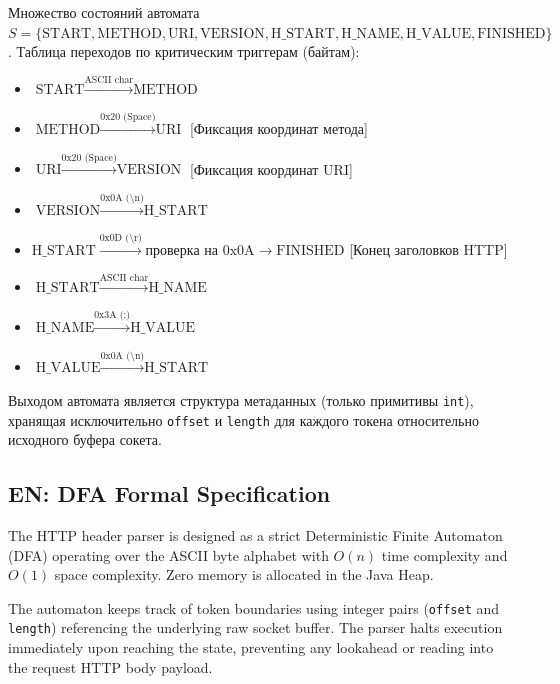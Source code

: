 \documentclass[12pt,a4paper]{article}
\begin{document}
Множество состояний автомата $S = \{ \text{START}, \text{METHOD}, \text{URI}, \text{VERSION}, \text{H\_START}, \text{H\_NAME}, \text{H\_VALUE}, \text{FINISHED} \}$.
Таблица переходов по критическим триггерам (байтам):
\begin{itemize}
    \item $\text{START} \xrightarrow{\text{ASCII char}} \text{METHOD}$
    \item $\text{METHOD} \xrightarrow{\text{0x20 (Space)}} \text{URI}$ [Фиксация координат метода]
    \item $\text{URI} \xrightarrow{\text{0x20 (Space)}} \text{VERSION}$ [Фиксация координат URI]
    \item $\text{VERSION} \xrightarrow{\text{0x0A (\textbackslash n)}} \text{H\_START}$
    \item $\text{H\_START} \xrightarrow{\text{0x0D (\textbackslash r)}} \text{проверка на 0x0A} \rightarrow \text{FINISHED}$ [Конец заголовков HTTP]
    \item $\text{H\_START} \xrightarrow{\text{ASCII char}} \text{H\_NAME}$
    \item $\text{H\_NAME} \xrightarrow{\text{0x3A (:)}} \text{H\_VALUE}$
    \item $\text{H\_VALUE} \xrightarrow{\text{0x0A (\textbackslash n)}} \text{H\_START}$
\end{itemize}

Выходом автомата является структура метаданных (только примитивы \texttt{int}), хранящая исключительно \texttt{offset} и \texttt{length} для каждого токена относительно исходного буфера сокета.

\subsection*{EN: DFA Formal Specification}
The HTTP header parser is designed as a strict Deterministic Finite Automaton (DFA) operating over the ASCII byte alphabet with $O(n)$ time complexity and $O(1)$ space complexity. Zero memory is allocated in the Java Heap.

The automaton keeps track of token boundaries using integer pairs (\texttt{offset} and \texttt{length}) referencing the underlying raw socket buffer. The parser halts execution immediately upon reaching the  state, preventing any lookahead or reading into the request HTTP body payload.
\end{document}
